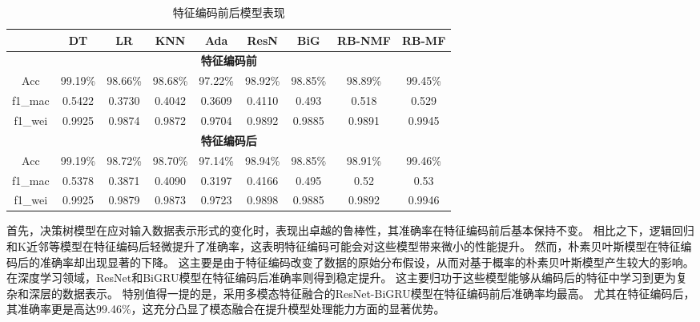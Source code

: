 \begin{table}[htbp]
	\centering
	\setlength{\tabcolsep}{3pt}
	\caption{特征编码前后模型表现}
	\label{tab:model_performance}
	\begin{tabular}{ccccccccc}
		\toprule
		        & DT               & LR              & KNN             & Ada               & ResN            & BiG           & RB-NMF          & RB-MF           \\
		\midrule
		\multicolumn{9}{c}{\textbf{特征编码前}}                                                                                                                       \\
		Acc     & 99.19\%          & 98.66\%         & 98.68\%         & 97.22\%           & 98.92\%         & 98.85\%       & 98.89\%         & 99.45\%         \\
		f1\_mac & 0.5422           & 0.3730          & 0.4042          & 0.3609            & 0.4110          & 0.493         & 0.518           & 0.529           \\
		f1\_wei & 0.9925           & 0.9874          & 0.9872          & 0.9704            & 0.9892          & 0.9885        & 0.9891          & 0.9945          \\
		\midrule
		\multicolumn{9}{c}{\textbf{特征编码后}}                                                                                                                       \\
		Acc     & 99.19\%          & 98.72\%\uparrow & 98.70\%\uparrow & 97.14\%\downarrow & 98.94\%\uparrow & 98.85\%       & 98.91\%\uparrow & 99.46\%\uparrow \\
		f1\_mac & 0.5378\downarrow & 0.3871\uparrow  & 0.4090\uparrow  & 0.3197\downarrow  & 0.4166\uparrow  & 0.495\uparrow & 0.52\uparrow    & 0.53\uparrow    \\
		f1\_wei & 0.9925           & 0.9879\uparrow  & 0.9873\uparrow  & 0.9723\uparrow    & 0.9898\uparrow  & 0.9885        & 0.9892\uparrow  & 0.9946\uparrow  \\
		\bottomrule
	\end{tabular}
\end{table}
首先，决策树模型在应对输入数据表示形式的变化时，表现出卓越的鲁棒性，其准确率在特征编码前后基本保持不变。
相比之下，逻辑回归和K近邻等模型在特征编码后轻微提升了准确率，这表明特征编码可能会对这些模型带来微小的性能提升。
然而，朴素贝叶斯模型在特征编码后的准确率却出现显著的下降。
这主要是由于特征编码改变了数据的原始分布假设，从而对基于概率的朴素贝叶斯模型产生较大的影响。
在深度学习领域，ResNet和BiGRU模型在特征编码后准确率则得到稳定提升。
这主要归功于这些模型能够从编码后的特征中学习到更为复杂和深层的数据表示。
特别值得一提的是，采用多模态特征融合的ResNet-BiGRU模型在特征编码前后准确率均最高。
尤其在特征编码后，其准确率更是高达99.46\%，这充分凸显了模态融合在提升模型处理能力方面的显著优势。\par


